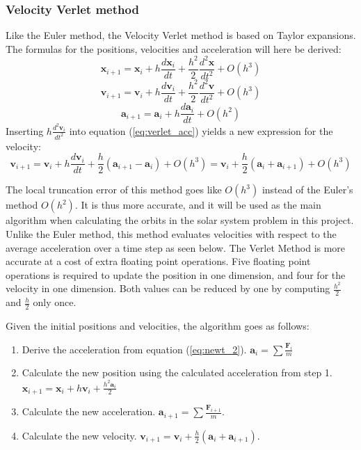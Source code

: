 \documentclass[10pt,a4paper,titlepage]{article}
\begin{document}
\subsubsection{Velocity Verlet method}
Like the Euler method, the Velocity Verlet method is based on Taylor expansions. The formulas for the positions, velocities and acceleration will here be derived:
\begin{equation}
\mathbf{x}_{i+1} = \mathbf{x}_i + h\frac{d\mathbf{x}_i}{dt}+\frac{h^2}{2}\frac{d^2\mathbf{x}}{dt^2}+O(h^3)
\end{equation}
\begin{equation}
\mathbf{v}_{i+1} = \mathbf{v}_i + h\frac{d\mathbf{v}_i}{dt}+\frac{h^2}{2}\frac{d^2\mathbf{v}}{dt^2}+O(h^3)
\end{equation}
\begin{equation}
\label{eq:verlet_acc}
\mathbf{a}_{i+1}=\mathbf{a}_i+h\frac{d\mathbf{a}_i}{dt}+O(h^2)
\end{equation}
Inserting $h\frac{d^2\mathbf{v}_i}{dt^2}$ into equation (\ref{eq:verlet_acc}) yields a new expression for the velocity:
\begin{equation}
\mathbf{v}_{i+1} = \mathbf{v}_i + h\frac{d\mathbf{v}_i}{dt}+\frac{h}{2}\left(\mathbf{a}_{i+1}-\mathbf{a}_i\right)+O(h^3) = \mathbf{v}_i + \frac{h}{2}(\mathbf{a}_i + \mathbf{a}_{i+1}) +O(h^3)
\end{equation}

The local truncation error of this method goes like $O(h^3)$ instead of the Euler's method $O(h^2)$. It is thus more accurate, and it will be used as the main algorithm when calculating the orbits in the solar system problem in this project. Unlike the Euler method, this method evaluates velocities with respect to the average acceleration over a time step as seen below. The Verlet Method is more accurate at a cost of extra floating point operations. Five floating point operations is required to update the position in one dimension, and four for the velocity in one dimension. Both values can be reduced by one by computing $\frac{h^2}{2}$ and $\frac{h}{2}$ only once. 

Given the initial positions and velocities, the algorithm goes as follows:
\begin{enumerate}%
\item Derive the acceleration from equation (\ref{eq:newt_2}).
\newline $\mathbf{a}_i=\sum\frac{\mathbf{F}_{i}}{m}$
\item Calculate the new position using the calculated acceleration from step 1. \newline
$\mathbf{x}_{i+1}=\mathbf{x}_i+h\mathbf{v}_i + \frac{h^2\mathbf{a}_i}{2}$
\item Calculate the new acceleration. \newline
\newline $\mathbf{a}_{i+1}=\sum\frac{\mathbf{F}_{i+1}}{m}$.
\item Calculate the new velocity. \newline
$\mathbf{v}_{i+1}=\mathbf{v}_i+\frac{h}{2}(\mathbf{a}_i+\mathbf{a}_{i+1})$.
\end{enumerate}
\end{document}
